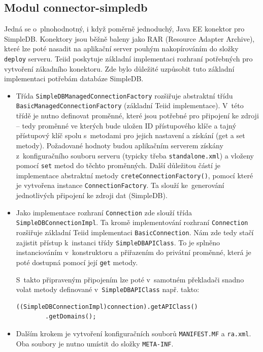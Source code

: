 \documentclass[oneside,12pt]{fithesis2}
\begin{document}
\subsection{Modul connector-simpledb}
\label{connector-simpledb}
Jedná se o~plnohodnotný, i když poměrně jednoduchý, Java EE konektor pro SimpleDB. Konektory jsou běžně baleny jako RAR (Resource Adapter Archive), které lze poté nasadit na aplikační server pouhým nakopírováním do složky \texttt{deploy} serveru. Teiid poskytuje základní implementaci rozhraní potřebných pro vytvoření zákadního konektoru. Zde bylo důležité uzpůsobit tuto základní implementaci potřebám databáze SimpleDB. 
\begin{itemize}
 \item Třída \texttt{SimpleDBManagedConnectionFactory} rozšiřuje abstraktní třídu \texttt{BasicManagedConnectionFactory} (základní Teiid implementace). V~této třídě je nutno definovat proměnné, které jsou potřebné pro připojení ke zdroji -- tedy proměnné ve kterých bude uložen ID přístupového klíče a tajný přístupový klíč spolu s~metodami pro jejich nastavení a získání (get a set metody). Požadované hodnoty budou aplikačním serverem získány z~konfiguračního souboru serveru (typicky třeba \texttt{standalone.xml}) a vloženy pomocí 
 \texttt{set} metod do těchto proměnných. Další důležitou částí je implementace abstraktní metody \texttt{creteConnectionFactory()}, pomocí které je vytvořena instance \texttt{ConnectionFactory}. Ta slouží ke~generování jednotlivých připojení ke zdroji dat (SimpleDB).
 
 \item Jako implementace rozhraní \texttt{Connection} zde slouží třída \texttt{SimpleDB\allowbreak ConnectionImpl}. Ta kromě implementování rozhraní \texttt{Connection} rozšiřuje základní Teiid implementaci \texttt{BasicConnection}. Nám zde tedy stačí zajistit přístup k~instanci třídy \texttt{SimpleDBAPIClass}. To je splněno instanciováním v~konstruktoru a přiřazením do privátní proměnné, která je poté dostupná pomocí její \texttt{get} metody.
 
 S~takto připraveným připojením lze poté v~samotném překladači snadno volat metody definované v~\texttt{SimpleDBAPIClass} např. takto:
 \begin{Verbatim}[fontsize=\small]
((SimpleDBConnectionImpl)connection).getAPIClass()
		.getDomains();
 \end{Verbatim}
 \item Dalším krokem je vytvoření konfiguračních souborů \texttt{MANIFEST.MF} a \texttt{ra.xml}. Oba soubory je nutno umístit do složky \texttt{META-INF}. 
 

\end{itemize}
\end{document}
